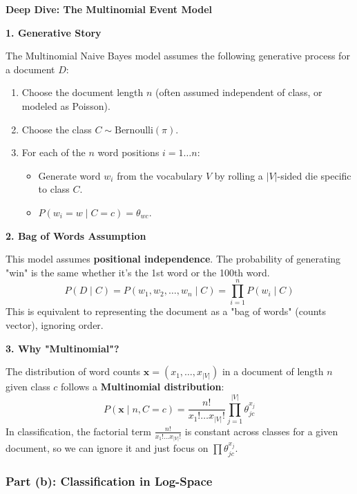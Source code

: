 \documentclass[12pt]{article}
\begin{document}
\begin{explanation}
\textbf{Deep Dive: The Multinomial Event Model}

\textbf{1. Generative Story}

The Multinomial Naive Bayes model assumes the following generative process for a document $D$:
\begin{enumerate}
    \item Choose the document length $n$ (often assumed independent of class, or modeled as Poisson).
    \item Choose the class $C \sim \text{Bernoulli}(\pi)$.
    \item For each of the $n$ word positions $i=1 \dots n$:
    \begin{itemize}
        \item Generate word $w_i$ from the vocabulary $V$ by rolling a $|V|$-sided die specific to class $C$.
        \item $P(w_i = w \mid C=c) = \theta_{wc}$.
    \end{itemize}
\end{enumerate}

\textbf{2. Bag of Words Assumption}

This model assumes \textbf{positional independence}. The probability of generating "win" is the same whether it's the 1st word or the 100th word.
\[
P(D \mid C) = P(w_1, w_2, \dots, w_n \mid C) = \prod_{i=1}^{n} P(w_i \mid C)
\]
This is equivalent to representing the document as a "bag of words" (counts vector), ignoring order.

\textbf{3. Why "Multinomial"?}

The distribution of word counts $\mathbf{x} = (x_1, \dots, x_{|V|})$ in a document of length $n$ given class $c$ follows a \textbf{Multinomial distribution}:
\[
P(\mathbf{x} \mid n, C=c) = \frac{n!}{x_1! \dots x_{|V|}!} \prod_{j=1}^{|V|} \theta_{jc}^{x_j}
\]
In classification, the factorial term $\frac{n!}{x_1! \dots x_{|V|}!}$ is constant across classes for a given document, so we can ignore it and just focus on $\prod \theta_{jc}^{x_j}$.
\end{explanation}

\subsubsection{Part (b): Classification in Log-Space}
\end{document}
